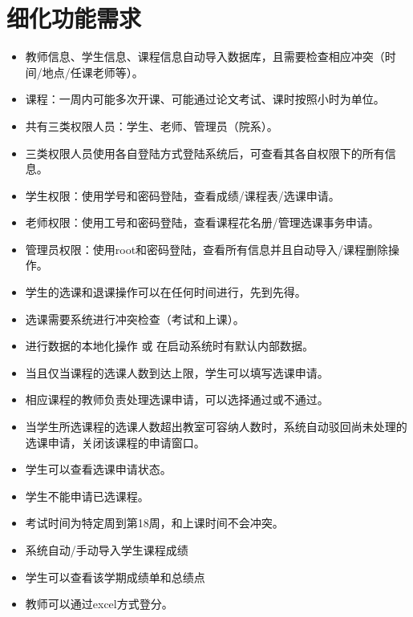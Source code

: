 
\section{细化功能需求}
\begin{itemize}
    \item 教师信息、学生信息、课程信息自动导入数据库，且需要检查相应冲突（时间/地点/任课老师等）。
    \item 课程：一周内可能多次开课、可能通过论文考试、课时按照小时为单位。
    \item 共有三类权限人员：学生、老师、管理员（院系）。
    \item 三类权限人员使用各自登陆方式登陆系统后，可查看其各自权限下的所有信息。
    \item 学生权限：使用学号和密码登陆，查看成绩/课程表/选课申请。
    \item 老师权限：使用工号和密码登陆，查看课程花名册/管理选课事务申请。
    \item 管理员权限：使用root和密码登陆，查看所有信息并且自动导入/课程删除操作。
    \item 学生的选课和退课操作可以在任何时间进行，先到先得。
    \item 选课需要系统进行冲突检查（考试和上课）。
    \item 进行数据的本地化操作 或 在启动系统时有默认内部数据。
    \item 当且仅当课程的选课人数到达上限，学生可以填写选课申请。
    \item 相应课程的教师负责处理选课申请，可以选择通过或不通过。
    \item 当学生所选课程的选课人数超出教室可容纳人数时，系统自动驳回尚未处理的选课申请，关闭该课程的申请窗口。
    \item 学生可以查看选课申请状态。
    \item 学生不能申请已选课程。
    \item 考试时间为特定周到第18周，和上课时间不会冲突。
    \item 系统自动/手动导入学生课程成绩
    \item 学生可以查看该学期成绩单和总绩点
    \item 教师可以通过excel方式登分。
\end{itemize}


